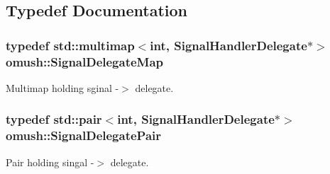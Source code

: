 \subsection{Typedef Documentation}
\hypertarget{namespaceomush_a1d7529318966c643d1dd1eec7d619ebc}{
\subsubsection[{Signal\-Delegate\-Map}]{\setlength{\rightskip}{0pt plus 5cm}typedef std\-::multimap$<$int, {\bf Signal\-Handler\-Delegate}$\ast$$>$ {\bf omush\-::\-Signal\-Delegate\-Map}}}\label{namespaceomush_a1d7529318966c643d1dd1eec7d619ebc}
Multimap holding sginal -\/$>$ delegate. \hypertarget{namespaceomush_ac30cad3dc5c8f3a450a56b1fcc88028d}{
\subsubsection[{Signal\-Delegate\-Pair}]{\setlength{\rightskip}{0pt plus 5cm}typedef std\-::pair$<$int, {\bf Signal\-Handler\-Delegate}$\ast$$>$ {\bf omush\-::\-Signal\-Delegate\-Pair}}}\label{namespaceomush_ac30cad3dc5c8f3a450a56b1fcc88028d}
Pair holding singal -\/$>$ delegate. 